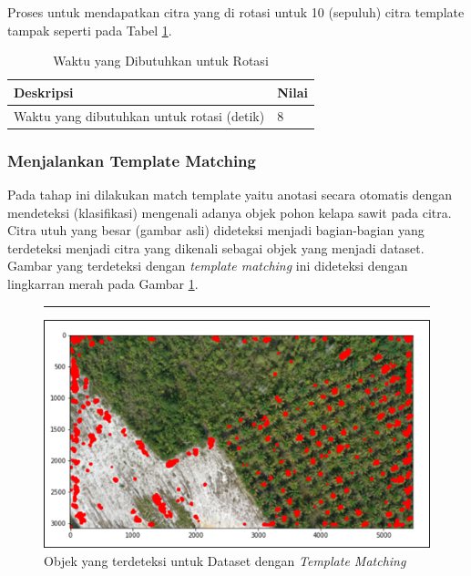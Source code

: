 Proses untuk mendapatkan citra yang di rotasi untuk 10 (sepuluh) citra template tampak seperti pada Tabel \ref{tbl:Waktu-Yang-Dibutuhkan-Untuk-Rotasi}. 

\begin{singlespace}
	\begin{table}[H]
		\centering
		\caption{Waktu yang Dibutuhkan untuk Rotasi}
		\label{tbl:Waktu-Yang-Dibutuhkan-Untuk-Rotasi}
		\begin{tabular}{|p{8cm}|p{4cm}|}
			\hline
			\rowcolor[HTML]{D9D9D9} 
			Deskripsi                                  & Nilai \\ \hline
			Waktu yang dibutuhkan untuk rotasi (detik) & 8 \\ \hline
		\end{tabular}
	\end{table}
\end{singlespace}

\subsubsection{Menjalankan Template Matching}
\hspace{1,2cm}
Pada tahap ini dilakukan match template yaitu anotasi secara otomatis dengan mendeteksi (klasifikasi) mengenali adanya objek pohon kelapa sawit pada citra. Citra utuh yang besar (gambar asli) dideteksi menjadi bagian-bagian yang terdeteksi menjadi citra yang dikenali sebagai objek yang menjadi dataset. Gambar yang terdeteksi dengan \textit{template matching} ini dideteksi dengan lingkarran merah pada Gambar \ref{img:Objek-Yang-Terdeteksi-Untuk-Dataset}.

\begin{figure}[H]
	\vspace{-0.1cm}
	\rule{\columnwidth}{0.1pt}
	\begin{center}
		\includegraphics[width=1\columnwidth]{bab4/Gambar/Picture16.png}
	\end{center}
	\vspace{-0.2cm}
	\captionsetup{justification=centering}
	\caption{Objek yang terdeteksi untuk Dataset dengan \textit{Template Matching}}\label{img:Objek-Yang-Terdeteksi-Untuk-Dataset}
\end{figure}

